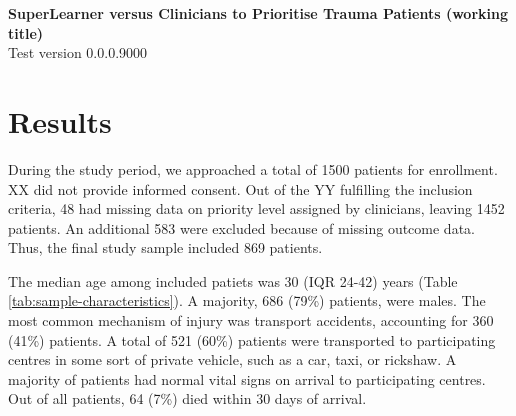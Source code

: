 \documentclass[10pt,letterpaper]{article}\usepackage[]{graphicx}\usepackage[]{color}
\begin{document}
{\Large
  \noindent\textbf{SuperLearner versus Clinicians to Prioritise Trauma Patients (working title)}
} \newline
\\
{\large
  Test version 0.0.0.9000
}
\section*{Results}
During the study period, we approached a total of 1500 patients
for enrollment. XX did not provide informed consent. Out of the YY fulfilling
the inclusion criteria, 48 had missing data on priority level
assigned by clinicians, leaving 1452
patients. An additional 583 were excluded because of missing outcome
data. Thus, the final study sample included
869 patients. 

The median age among included patiets was 30 (IQR 24-42) years (Table
\ref{tab:sample-characteristics}). A majority, 686 (79\%)
patients, were males. The most common mechanism of injury was transport
accidents, accounting for 360 (41\%)
patients. A total of 521 (60\%) patients were
transported to participating centres in some sort of private vehicle, such as a
car, taxi, or rickshaw. A majority of patients had normal vital signs on arrival
to participating centres. Out of all patients, 64 (7\%)
died within 30 days of arrival.
\end{document}
